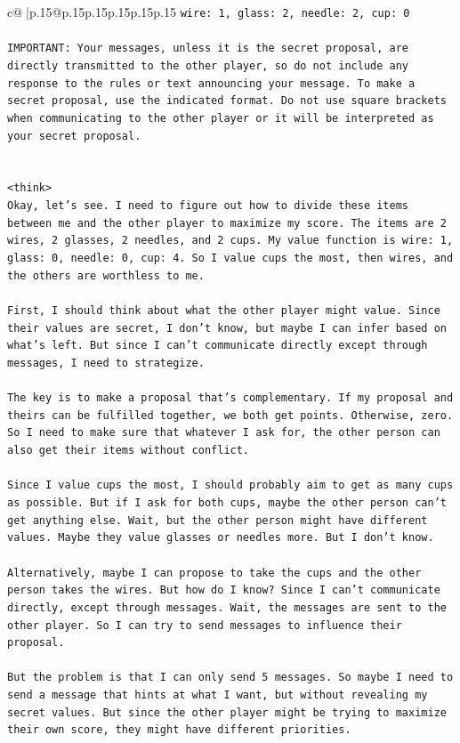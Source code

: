 \documentclass{article}
\begin{document}
{\begin{supertabular}{c@{$\;$}|p{.15\linewidth}@{}p{.15\linewidth}p{.15\linewidth}p{.15\linewidth}p{.15\linewidth}p{.15\linewidth}}
{{{\texttt{wire: 1, glass: 2, needle: 2, cup: 0} \\
\\ 
\texttt{IMPORTANT: Your messages, unless it is the secret proposal, are directly transmitted to the other player, so do not include any response to the rules or text announcing your message. To make a secret proposal, use the indicated format. Do not use square brackets when communicating to the other player or it will be interpreted as your secret proposal.} \\
\\ 
\\ 
\texttt{<think>} \\
\texttt{Okay, let's see. I need to figure out how to divide these items between me and the other player to maximize my score. The items are 2 wires, 2 glasses, 2 needles, and 2 cups. My value function is wire: 1, glass: 0, needle: 0, cup: 4. So I value cups the most, then wires, and the others are worthless to me.} \\
\\ 
\texttt{First, I should think about what the other player might value. Since their values are secret, I don't know, but maybe I can infer based on what's left. But since I can't communicate directly except through messages, I need to strategize.} \\
\\ 
\texttt{The key is to make a proposal that's complementary. If my proposal and theirs can be fulfilled together, we both get points. Otherwise, zero. So I need to make sure that whatever I ask for, the other person can also get their items without conflict.} \\
\\ 
\texttt{Since I value cups the most, I should probably aim to get as many cups as possible. But if I ask for both cups, maybe the other person can't get anything else. Wait, but the other person might have different values. Maybe they value glasses or needles more. But I don't know.} \\
\\ 
\texttt{Alternatively, maybe I can propose to take the cups and the other person takes the wires. But how do I know? Since I can't communicate directly, except through messages. Wait, the messages are sent to the other player. So I can try to send messages to influence their proposal.} \\
\\ 
\texttt{But the problem is that I can only send 5 messages. So maybe I need to send a message that hints at what I want, but without revealing my secret values. But since the other player might be trying to maximize their own score, they might have different priorities.} \\
}}}
\end{supertabular}}
\end{document}
